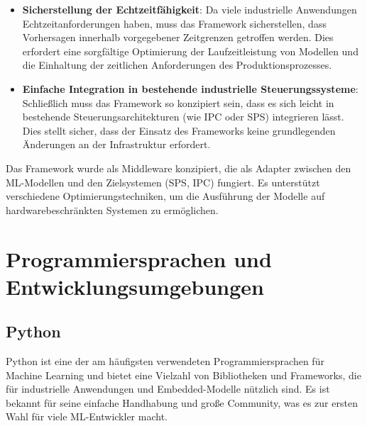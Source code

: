 \begin{itemize}
    \item \textbf{Sicherstellung der Echtzeitfähigkeit}: Da viele industrielle Anwendungen Echtzeitanforderungen haben, muss das Framework sicherstellen, dass Vorhersagen innerhalb 
    vorgegebener Zeitgrenzen getroffen werden. Dies erfordert eine sorgfältige Optimierung der Laufzeitleistung von Modellen und die Einhaltung der zeitlichen Anforderungen des Produktionsprozesses.
    
    \item \textbf{Einfache Integration in bestehende industrielle Steuerungssysteme}: Schließlich muss das Framework so konzipiert sein, 
    dass es sich leicht in bestehende Steuerungsarchitekturen (wie IPC oder SPS) integrieren lässt. 
    Dies stellt sicher, dass der Einsatz des Frameworks keine grundlegenden Änderungen an der Infrastruktur erfordert.
\end{itemize}

Das Framework wurde als Middleware konzipiert, die als Adapter zwischen den ML-Modellen und den Zielsystemen (SPS, IPC) fungiert. 
Es unterstützt verschiedene Optimierungstechniken, um die Ausführung der Modelle auf hardwarebeschränkten Systemen zu ermöglichen.

\section{Programmiersprachen und Entwicklungsumgebungen}

\subsection{Python}
Python ist eine der am häufigsten verwendeten Programmiersprachen für Machine Learning und bietet eine Vielzahl von Bibliotheken und Frameworks, 
die für industrielle Anwendungen und Embedded-Modelle nützlich sind. Es ist bekannt für seine einfache Handhabung und große Community, 
was es zur ersten Wahl für viele ML-Entwickler macht.

